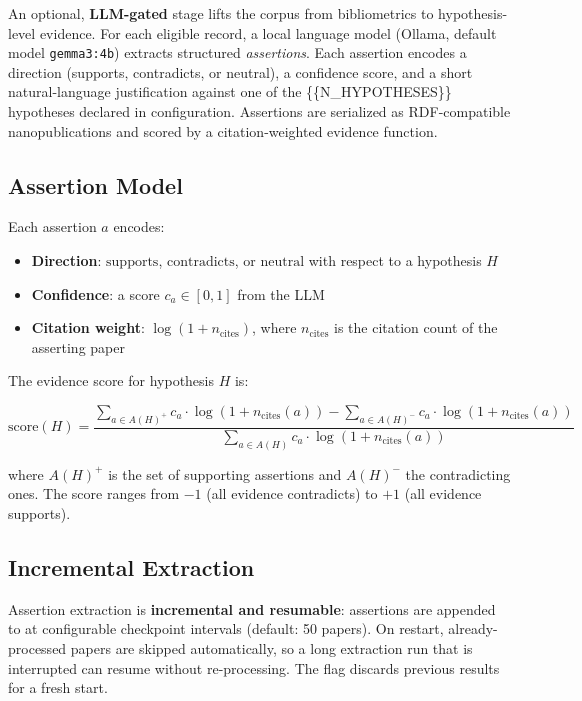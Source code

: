 \documentclass[
]{article}
\providecommand{\tightlist}{%
  \setlength{\itemsep}{0pt}\setlength{\parskip}{0pt}}
\begin{document}
An optional, \textbf{LLM-gated} stage lifts the corpus from
bibliometrics to hypothesis-level evidence. For each eligible record, a
local language model (Ollama, default model \texttt{gemma3:4b}) extracts
structured \emph{assertions}. Each assertion encodes a direction
(supports, contradicts, or neutral), a confidence score, and a short
natural-language justification against one of the \{\{N\_HYPOTHESES\}\}
hypotheses declared in configuration. Assertions are serialized as
RDF-compatible nanopublications \citep{kuhn2016decentralized} and scored
by a citation-weighted evidence function.

\subsection{Assertion Model}\label{assertion-model}

Each assertion \(a\) encodes:

\begin{itemize}
\tightlist
\item
  \textbf{Direction}: \(\text{supports}\), \(\text{contradicts}\), or
  \(\text{neutral}\) with respect to a hypothesis \(H\)
\item
  \textbf{Confidence}: a score \(c_a \in [0, 1]\) from the LLM
\item
  \textbf{Citation weight}: \(\log(1 + n_{\text{cites}})\), where
  \(n_{\text{cites}}\) is the citation count of the asserting paper
\end{itemize}

The evidence score for hypothesis \(H\) is:

\[
\text{score}(H) = \frac{\sum_{a \in A(H)^+} c_a \cdot \log(1 + n_{\text{cites}}(a)) -
\sum_{a \in A(H)^-} c_a \cdot \log(1 + n_{\text{cites}}(a))}
{\sum_{a \in A(H)} c_a \cdot \log(1 + n_{\text{cites}}(a))}
\]

where \(A(H)^+\) is the set of supporting assertions and \(A(H)^-\) the
contradicting ones. The score ranges from \(-1\) (all evidence
contradicts) to \(+1\) (all evidence supports).

\subsection{Incremental Extraction}\label{incremental-extraction}

Assertion extraction is \textbf{incremental and resumable}: assertions
are appended to  at configurable
checkpoint intervals (default: 50 papers). On restart, already-processed
papers are skipped automatically, so a long extraction run that is
interrupted can resume without re-processing. The
 flag discards previous results for a fresh
start.
\end{document}
